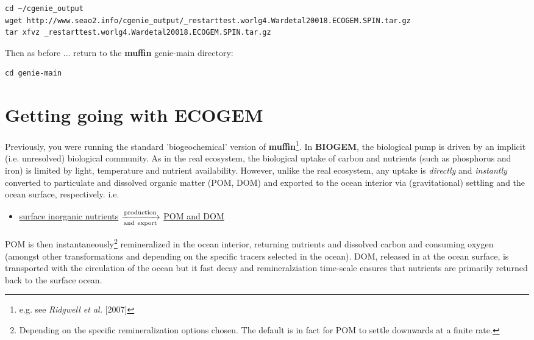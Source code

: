 \documentclass[11pt,fleqn]{book} %
\begin{document}
\vspace{-2mm}
\footnotesize\begin{verbatim}
cd ~/cgenie_output
wget http://www.seao2.info/cgenie_output/_restarttest.worlg4.Wardetal20018.ECOGEM.SPIN.tar.gz
tar xfvz _restarttest.worlg4.Wardetal20018.ECOGEM.SPIN.tar.gz
\end{verbatim}\normalsize
\vspace{-2mm}

\noindent Then as before ... return to the \textbf{muffin} \footnotesize\textsf{genie-main }\normalsize directory:

\vspace{-2mm}
\small\begin{verbatim}
cd genie-main
\end{verbatim}\normalsize
\vspace{-2mm}


\newpage


\section{Getting going with ECOGEM}

Previously, you were running the standard 'biogeochemical' version of \textbf{muffin}\footnote{e.g. see \textit{Ridgwell et al.} [2007]}.  In \textbf{BIOGEM}, the biological pump is driven by an implicit (i.e. unresolved) biological community. As in the real ecosystem, the biological uptake of carbon and nutrients (such as phosphorus and iron) is limited by light, temperature and nutrient availability. However, unlike the real ecosystem, any uptake is \textit{directly} and \textit{instantly} converted to particulate and dissolved organic matter (POM, DOM) and exported to the ocean interior via (gravitational) settling and the ocean surface, respectively. i.e.
\vspace{4mm}
\begin{itemize}
\item \underline{surface inorganic nutrients} $\xrightarrow[\rm and~export]{\rm production}$ \underline{POM and DOM}
\end{itemize}
\vspace{4mm}
POM is then instantaneously\footnote{Depending on the specific remineralization options chosen. The default is in fact for POM to settle downwards at a finite rate.} remineralized in the ocean interior, returning nutrients and dissolved carbon and consuming oxygen (amongst other transformations and depending on the specific tracers selected in the ocean). DOM, released in at the ocean surface, is transported with the circulation of the ocean but it fast decay and remineralziation time-scale ensures that nutrients are primarily returned  back to the surface ocean.
\end{document}
